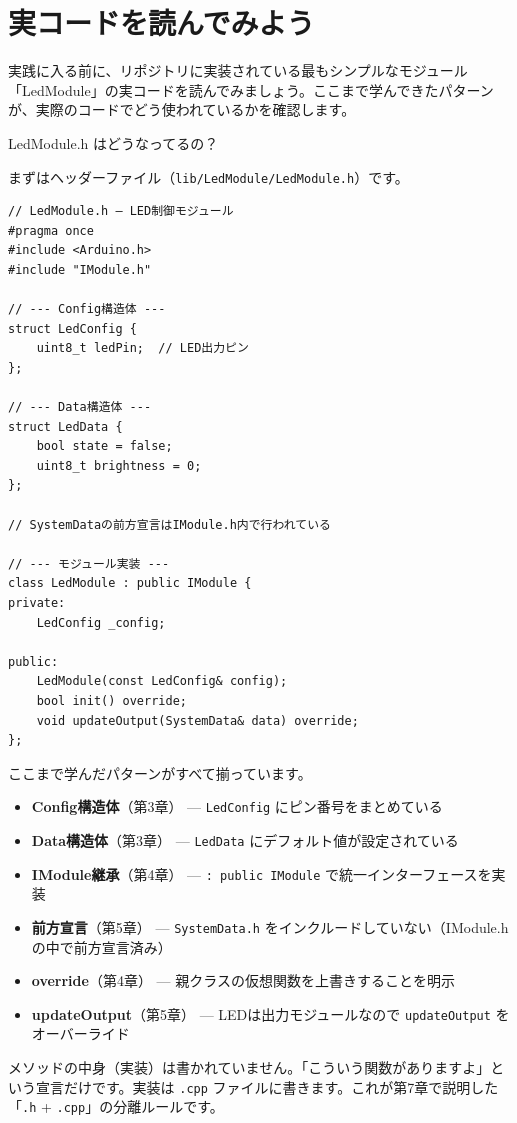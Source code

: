 \section{実コードを読んでみよう}

実践に入る前に、リポジトリに実装されている最もシンプルなモジュール「LedModule」の実コードを読んでみましょう。ここまで学んできたパターンが、実際のコードでどう使われているかを確認します。

\begin{qabox}{LedModule.h はどうなってるの？}

まずはヘッダーファイル（\texttt{lib/LedModule/LedModule.h}）です。

\begin{lstlisting}
// LedModule.h — LED制御モジュール
#pragma once
#include <Arduino.h>
#include "IModule.h"

// --- Config構造体 ---
struct LedConfig {
    uint8_t ledPin;  // LED出力ピン
};

// --- Data構造体 ---
struct LedData {
    bool state = false;
    uint8_t brightness = 0;
};

// SystemDataの前方宣言はIModule.h内で行われている

// --- モジュール実装 ---
class LedModule : public IModule {
private:
    LedConfig _config;

public:
    LedModule(const LedConfig& config);
    bool init() override;
    void updateOutput(SystemData& data) override;
};
\end{lstlisting}

ここまで学んだパターンがすべて揃っています。

\begin{itemize}
  \item \textbf{Config構造体}（第3章） — \texttt{LedConfig} にピン番号をまとめている
  \item \textbf{Data構造体}（第3章） — \texttt{LedData} にデフォルト値が設定されている
  \item \textbf{IModule継承}（第4章） — \texttt{: public IModule} で統一インターフェースを実装
  \item \textbf{前方宣言}（第5章） — \texttt{SystemData.h} をインクルードしていない（IModule.hの中で前方宣言済み）
  \item \textbf{override}（第4章） — 親クラスの仮想関数を上書きすることを明示
  \item \textbf{updateOutput}（第5章） — LEDは出力モジュールなので \texttt{updateOutput} をオーバーライド
\end{itemize}

\begin{notebox}[ヘッダーには宣言だけ]
メソッドの中身（実装）は書かれていません。「こういう関数がありますよ」という宣言だけです。実装は \texttt{.cpp} ファイルに書きます。これが第7章で説明した「\texttt{.h} + \texttt{.cpp}」の分離ルールです。
\end{notebox}

\end{qabox}

